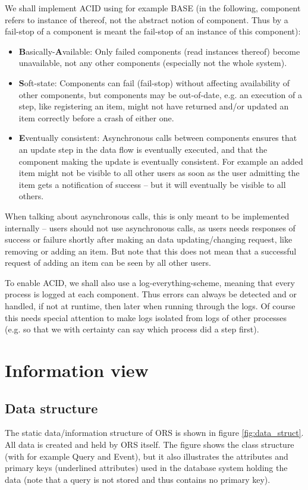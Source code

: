We shall implement ACID using for example BASE (in the following, component refers to instance of thereof, not the abstract notion of component. Thus by a fail-stop of a component is meant the fail-stop of an instance of this component):
\begin{itemize}
    \item \textbf{B}asically-\textbf{A}vailable: Only failed components (read instances thereof) become unavailable, not any other components (especially not the whole system).
    \item \textbf{S}oft-state: Components can fail (fail-stop) without affecting availability of other components, but components may be out-of-date, e.g. an execution of a step, like registering an item, might not have returned and/or updated an item correctly before a crash of either one.
    \item \textbf{E}ventually consistent: Asynchronous calls between components ensures that an update step in the data flow is eventually executed, and that the component making the update is eventually consistent. For example an added item might not be visible to all other users as soon as the user admitting the item gets a notification of success -- but it will eventually be visible to all others.
\end{itemize}
When talking about asynchronous calls, this is only meant to be implemented internally -- users should not use asynchronous calls, as users needs responses of success or failure shortly after making an data updating/changing request, like removing or adding an item. But note that this does not mean that a successful request of adding an item can be seen by all other users.

To enable ACID, we shall also use a log-everything-scheme, meaning that every process is logged at each component. Thus errors can always be detected and or handled, if not at runtime, then later when running through the logs. Of course this needs special attention to make logs isolated from logs of other processes (e.g. so that we with certainty can say which process did a step first).


\section{Information view}
\label{cha:information-view}


\subsection{Data structure}
\label{sec:data-structure}
The static data/information structure of ORS is shown in figure \ref{fig:data_struct}. All data is created and held by ORS itself. The figure shows the class structure (with for example Query and Event), but it also illustrates the attributes and primary keys (underlined attributes) used in the database system holding the data (note that a query is not stored and thus contains no primary key).

